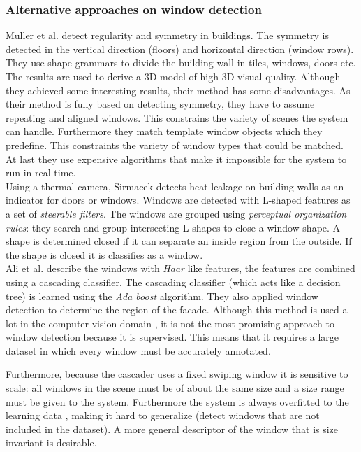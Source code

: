 \subsubsection{Alternative approaches on window detection}
Muller et al. \cite{Muller_procedural} detect regularity and symmetry in
buildings. The
symmetry is detected in the vertical direction (floors) and horizontal direction (window
rows).
They use shape grammars to divide the building wall in tiles, windows, doors etc.
The results are used to derive a 3D model of high 3D visual quality.
Although they achieved some interesting results, their method has some
disadvantages.  As their method is fully based on detecting symmetry, they have
to assume repeating and aligned windows. This constrains the variety of scenes
the system can handle.
Furthermore they match template window objects which they predefine. This 
constraints the variety of window types that could be matched.  At last 
they use expensive algorithms that make it impossible for the system
to run in real time.  \\

Using a thermal camera, Sirmacek \cite{Sirmacek_thermal}
detects heat leakage on building walls as an indicator for doors or windows.
Windows are detected with L-shaped features as a set of \emph{steerable filters}.
The windows are grouped using \emph{perceptual organization rules}:
they search and group intersecting L-shapes to close a window shape. A shape is
determined closed if it can separate an inside region from the outside. If the
shape is closed it is classifies as a window.\\

Ali et al. \cite{Ali_facades} describe the windows with \emph{Haar} like
features, the features are combined using a cascading classifier. The cascading
classifier (which acts like a decision tree) is learned using the \emph{Ada
boost} algorithm.  They also applied window detection to determine the region of
the facade.
Although this method is used a lot in the computer vision domain \cite{haarlike}, it is not the most
promising approach to window detection because it is supervised.  This means
that it requires a large dataset in which every window must be accurately
annotated.  

Furthermore, because the cascader uses a fixed swiping window it is sensitive to
scale: all windows in the scene must be of about the same size and a size range must be given to the system.
Furthermore the system is always overfitted to the learning data
, making it hard to generalize (detect windows that are
not included in the dataset).  A more general descriptor of the window that is
size invariant is desirable.\\

